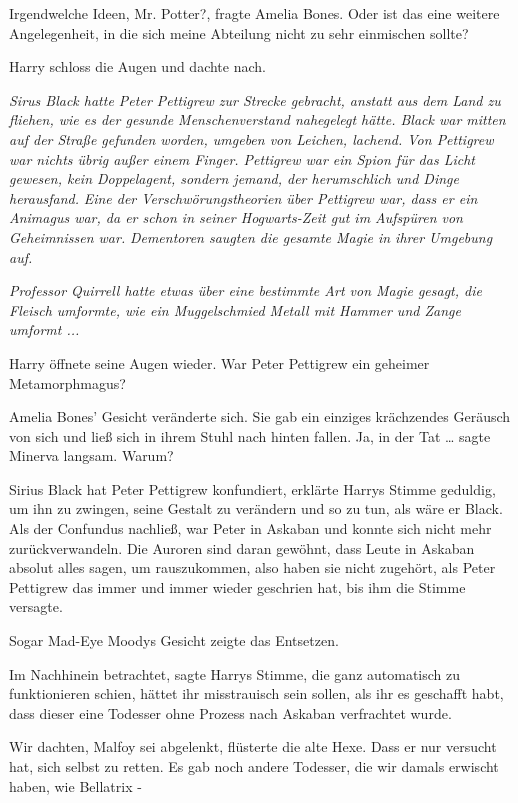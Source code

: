 \glqq{}Irgendwelche Ideen, Mr. Potter?\grqq{}, fragte Amelia Bones. \glqq{}Oder
ist das eine weitere Angelegenheit, in die sich meine Abteilung nicht zu sehr
einmischen sollte?\grqq{}

Harry schloss die Augen und dachte nach.

\emph{Sirus Black hatte Peter Pettigrew zur Strecke gebracht, anstatt aus dem
Land zu fliehen, wie es der gesunde Menschenverstand nahegelegt hätte. Black war
mitten auf der Straße gefunden worden, umgeben von Leichen, lachend. Von
Pettigrew war nichts übrig außer einem Finger. Pettigrew war ein Spion für das
Licht gewesen, kein Doppelagent, sondern jemand, der herumschlich und Dinge
herausfand.} \emph{ Eine der Verschwörungstheorien über Pettigrew war, dass er
ein Animagus war, da er schon in seiner Hogwarts-Zeit gut im Aufspüren von
Geheimnissen war.} \emph{ Dementoren saugten die gesamte Magie in ihrer Umgebung
auf.}

\emph{Professor Quirrell hatte etwas über eine bestimmte Art von Magie gesagt,
die Fleisch umformte, wie ein Muggelschmied Metall mit Hammer und Zange
umformt ...}

Harry öffnete seine Augen wieder. \glqq{}War Peter Pettigrew ein geheimer
Metamorphmagus?\grqq{}

Amelia Bones' Gesicht veränderte sich. Sie gab ein einziges krächzendes Geräusch
von sich und ließ sich in ihrem Stuhl nach hinten fallen. \glqq{}Ja, in der Tat
…\grqq{} sagte Minerva langsam. \glqq{}Warum?\grqq{}

\glqq{}Sirius Black hat Peter Pettigrew konfundiert\grqq{}, erklärte Harrys
Stimme geduldig, \glqq{}um ihn zu zwingen, seine Gestalt zu verändern und so zu
tun, als wäre er Black. Als der Confundus nachließ, war Peter in Askaban und
konnte sich nicht mehr zurückverwandeln. Die Auroren sind daran gewöhnt, dass
Leute in Askaban absolut alles sagen, um rauszukommen, also haben sie nicht
zugehört, als Peter Pettigrew das immer und immer wieder geschrien hat, bis ihm
die Stimme versagte.\grqq{}

Sogar Mad-Eye Moodys Gesicht zeigte das Entsetzen.

\glqq{}Im Nachhinein betrachtet\grqq{}, sagte Harrys Stimme, die ganz automatisch
zu funktionieren schien, \glqq{}hättet ihr misstrauisch sein sollen, als ihr es
geschafft habt, dass dieser eine Todesser ohne Prozess nach Askaban verfrachtet
wurde.\grqq{}

\glqq{}Wir dachten, Malfoy sei abgelenkt\grqq{}, flüsterte die alte Hexe. \glqq{}
Dass er nur versucht hat, sich selbst zu retten. Es gab noch andere Todesser,
die wir damals erwischt haben, wie Bellatrix -\grqq{}

